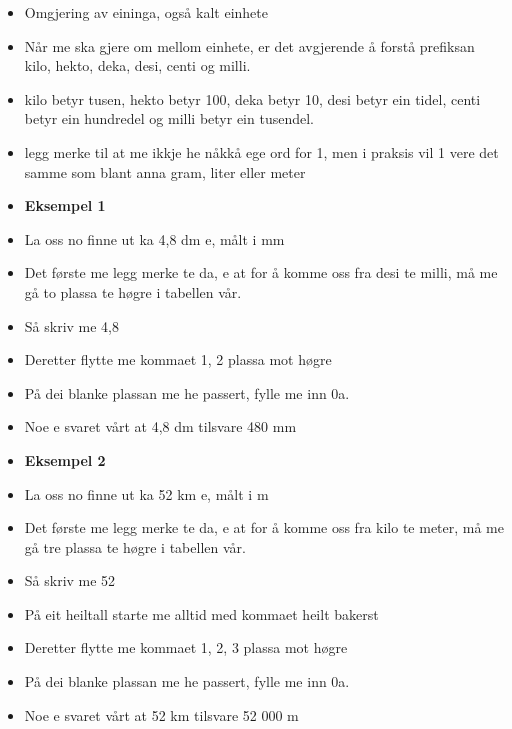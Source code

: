 


\begin{itemize}
	\item Omgjering av eininga, også kalt einhete
	\item Når me ska gjere om mellom einhete, er det avgjerende å forstå prefiksan kilo, hekto, deka, desi, centi og milli.
	\item kilo betyr tusen, hekto betyr 100, deka betyr 10, desi betyr ein tidel, centi betyr ein hundredel og milli betyr ein tusendel.
	\item legg merke til at me ikkje he nåkkå ege ord for 1, men i praksis vil 1 vere det samme som blant anna gram, liter eller meter
\end{itemize}

\begin{itemize}
	\item\textbf{ Eksempel 1}
	\item La oss no finne ut ka 4,8 dm e, målt i mm
	\item Det første me legg merke te da, e at for å komme oss fra desi te milli, må me gå to plassa te høgre i tabellen vår.
	\item Så skriv me 4,8
	\item Deretter flytte me kommaet 1, 2 plassa mot høgre
	\item På dei blanke plassan me he passert, fylle me inn 0a. 
	\item Noe e svaret vårt at 4,8 dm tilsvare 480 mm
\end{itemize}

\begin{itemize}
	\item\textbf{ Eksempel 2}
	\item La oss no finne ut ka 52 km e, målt i m
	\item Det første me legg merke te da, e at for å komme oss fra kilo te meter, må me gå tre plassa te høgre i tabellen vår.
	\item Så skriv me 52
	\item På eit heiltall starte me alltid med kommaet heilt bakerst
	\item Deretter flytte me kommaet 1, 2, 3 plassa mot høgre
	\item På dei blanke plassan me he passert, fylle me inn 0a. 
	\item Noe e svaret vårt at 52 km tilsvare 52 000 m
\end{itemize}

